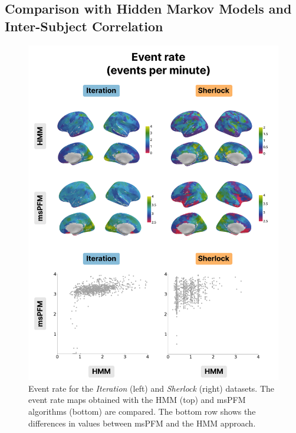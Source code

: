 \subsection{Comparison with Hidden Markov Models and Inter-Subject Correlation}

\begin{figure}[!ht]
\centering
\includegraphics[width=0.7\linewidth]{figures/multi_subject/event_rate.png}
\caption[]{Event rate for the \textit{Iteration} (left) and \textit{Sherlock}
(right) datasets. The event rate maps obtained with the HMM (top) and msPFM
algorithms (bottom) are compared. The bottom row shows the differences in values
between msPFM and the HMM approach.}
\label{fig:event_rate}
\end{figure}

